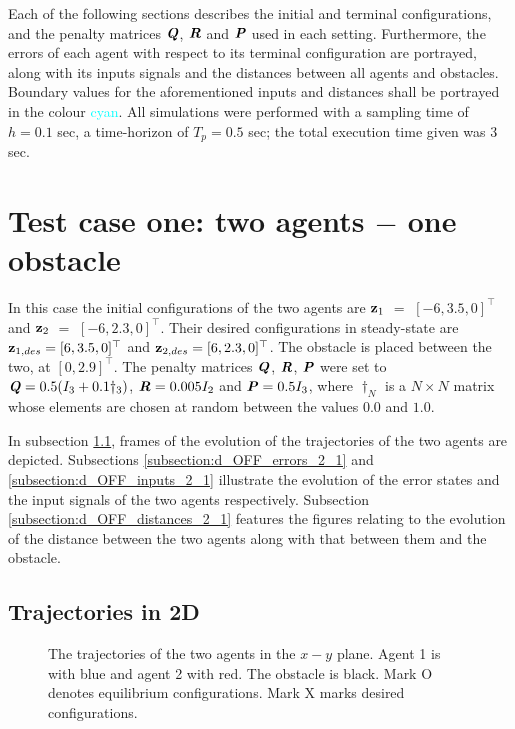 Each of the following sections describes the initial and terminal configurations,
and the penalty matrices $\bm{\mathit{Q}}$, $\bm{\mathit{R}}$ and $\bm{\mathit{P}}$ used in each setting.
Furthermore, the errors of each agent with respect to its terminal configuration
are portrayed, along with its inputs signals and the distances between all
agents and obstacles. Boundary values for the aforementioned inputs and
distances shall be portrayed in the colour \textcolor{cyan}{cyan}.
All simulations were performed with a sampling time of $h = 0.1$ sec,
a time-horizon of $T_p = 0.5$ sec; the total execution time given was $3$ sec.


\section{Test case one: two agents $-$ one obstacle}

In this case the initial configurations of the two agents are
$\bm{\mathbf{z}}_1$ $=$ $[-6, 3.5, 0]^{\top}$ and
$\bm{\mathbf{z}}_2$ $=$ $[-6, 2.3, 0]^{\top}$.
Their desired configurations in steady-state are
$\bm{\mathbf{z}}_{1,des} = [6, 3.5, 0]^{\top}$ and
$\bm{\mathbf{z}}_{2,des} = [6, 2.3, 0]^{\top}$.
The obstacle is placed between the two, at $[0, 2.9]^{\top}$. The penalty
matrices $\bm{\mathit{Q}}$, $\bm{\mathit{R}}$, $\bm{\mathit{P}}$ were set to
$\bm{\mathit{Q}} = 0.5 (I_3 + 0.1 \dagger_3)$, $\bm{\mathit{R}} = 0.005 I_2$ and
$\bm{\mathit{P}} = 0.5 I_3$, where $\dagger_N$ is a $N \times N$ matrix whose
elements are chosen at random between the values $0.0$ and $1.0$.

In subsection \ref{subsection:d_OFF_trajectories_2_1}, frames of the evolution of the
trajectories of the two agents are depicted. Subsections
\ref{subsection:d_OFF_errors_2_1} and \ref{subsection:d_OFF_inputs_2_1} illustrate
the evolution of the error states and the input signals of the two agents
respectively. Subsection \ref{subsection:d_OFF_distances_2_1} features the
figures relating to the evolution of the distance between the two agents
along with that between them and the obstacle.



\subsection{Trajectories in 2D}
\label{subsection:d_OFF_trajectories_2_1}

\begin{figure}[H]
  \scalebox{0.9}{}
  \caption{The trajectories of the two agents in the $x-y$ plane. Agent 1 is with
    blue and agent 2 with red. The obstacle is black. Mark O denotes equilibrium
    configurations. Mark X marks desired configurations.}
  \label{fig:d_OFF_trajectory_2_1}
\end{figure}


